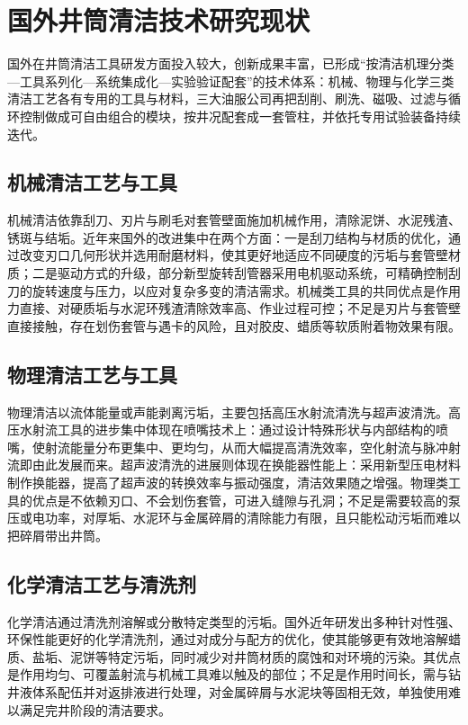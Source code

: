 \section{国外井筒清洁技术研究现状}

国外在井筒清洁工具研发方面投入较大，创新成果丰富，已形成“按清洁机理分类—工具系列化—系统集成化—实验验证配套”的技术体系：机械、物理与化学三类清洁工艺各有专用的工具与材料，三大油服公司再把刮削、刷洗、磁吸、过滤与循环控制做成可自由组合的模块，按井况配套成一套管柱，并依托专用试验装备持续迭代。

\subsection{机械清洁工艺与工具}

机械清洁依靠刮刀、刃片与刷毛对套管壁面施加机械作用，清除泥饼、水泥残渣、锈斑与结垢。近年来国外的改进集中在两个方面：一是刮刀结构与材质的优化，通过改变刃口几何形状并选用耐磨材料，使其更好地适应不同硬度的污垢与套管壁材质；二是驱动方式的升级，部分新型旋转刮管器采用电机驱动系统，可精确控制刮刀的旋转速度与压力，以应对复杂多变的清洁需求。机械类工具的共同优点是作用力直接、对硬质垢与水泥环残渣清除效率高、作业过程可控；不足是刃片与套管壁直接接触，存在划伤套管与遇卡的风险，且对胶皮、蜡质等软质附着物效果有限。

\subsection{物理清洁工艺与工具}

物理清洁以流体能量或声能剥离污垢，主要包括高压水射流清洗与超声波清洗。高压水射流工具的进步集中体现在喷嘴技术上：通过设计特殊形状与内部结构的喷嘴，使射流能量分布更集中、更均匀，从而大幅提高清洗效率，空化射流与脉冲射流即由此发展而来。超声波清洗的进展则体现在换能器性能上：采用新型压电材料制作换能器，提高了超声波的转换效率与振动强度，清洁效果随之增强。物理类工具的优点是不依赖刃口、不会划伤套管，可进入缝隙与孔洞；不足是需要较高的泵压或电功率，对厚垢、水泥环与金属碎屑的清除能力有限，且只能松动污垢而难以把碎屑带出井筒。

\subsection{化学清洁工艺与清洗剂}

化学清洁通过清洗剂溶解或分散特定类型的污垢。国外近年研发出多种针对性强、环保性能更好的化学清洗剂，通过对成分与配方的优化，使其能够更有效地溶解蜡质、盐垢、泥饼等特定污垢，同时减少对井筒材质的腐蚀和对环境的污染。其优点是作用均匀、可覆盖射流与机械工具难以触及的部位；不足是作用时间长，需与钻井液体系配伍并对返排液进行处理，对金属碎屑与水泥块等固相无效，单独使用难以满足完井阶段的清洁要求。

